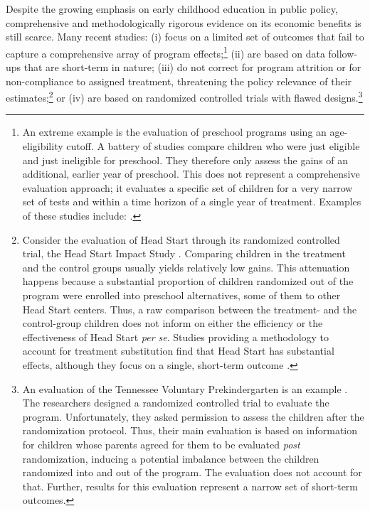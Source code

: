 \noindent Despite the growing emphasis on early childhood education in public policy, comprehensive and methodologically rigorous evidence on its economic benefits is still scarce. Many recent studies: (i) focus on a limited set of outcomes that fail to capture a comprehensive array of program effects;\footnote{An extreme example is the evaluation of preschool programs using an age-eligibility cutoff. A battery of studies compare children who were just eligible and just ineligible for preschool. They therefore only assess the gains of an additional, earlier year of preschool. This does not represent a comprehensive evaluation approach; it evaluates a specific set of children for a very narrow set of tests and within a time horizon of a single year of treatment. Examples of these studies include: \citet{Gormley_Gayer_2005_JHR,Gormley_Gayer_etal_2005_DP,Weiland_2013_CD_Impacts-of-Pre-K}.} (ii) are based on data follow-ups that are short-term in nature; (iii) do not correct for program attrition or for non-compliance to assigned treatment, threatening the policy relevance of their estimates;\footnote{Consider the evaluation of Head Start through its randomized controlled trial, the Head Start Impact Study \citep{Puma_Bell_etal_2010_HeadStartImpact}. Comparing children in the treatment and the control groups usually yields relatively low gains. This attenuation happens because a substantial proportion of children randomized out of the program were enrolled into preschool alternatives, some of them to other Head Start centers. Thus, a raw comparison between the treatment- and the control-group children does not inform on either the efficiency or the effectiveness of Head Start \emph{per se}. Studies providing a methodology to account for treatment substitution find that Head Start has substantial effects, although they focus on a single, short-term outcome \citep{Kline-Walters_2015_NBER-Evaluating,Feller_Grindal_etal_2016_ComparedtoWhat}.} or (iv) are based on randomized controlled trials with flawed designs.\footnote{An evaluation of the Tennessee Voluntary Prekindergarten is an example \citep{Lipsey_et_al_2013_Tennessee_Kindergrtn_PRI,Lipsey_et_al_2015_Randomized_Control_Trial_PRI}. The researchers designed a randomized controlled trial to evaluate the program. Unfortunately, they asked permission to assess the children after the randomization protocol. Thus, their main evaluation is based on information for children whose parents agreed for them to be evaluated \textit{post} randomization, inducing a potential imbalance between the children randomized into and out of the program. The evaluation does not account for that. Further, results for this evaluation represent a narrow set of short-term outcomes.}\\ 

